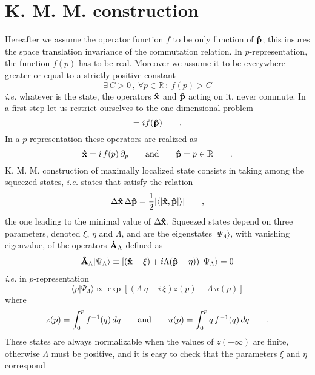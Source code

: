 \documentclass[a4paper,10pt]{article}
\newcommand{\x}{\mbox{\rm{\bf \^ x}}}
\newcommand{\p}{\mbox{\rm{\bf \^ p}}}
\newcommand{\A}{\mbox{\rm{\bf \^ A}}}
\newcommand{\f}{f({\p})}
\newcommand{\et}{\mbox{\rm{and}}}
\newcommand{\RR}{\mathbb R}
\newcommand{\KMM}{K. M. M. }
\begin{document}
\section{\KMM construction} Hereafter
we assume the operator function $f$ to be only function of $\p$;
this insures the space translation invariance of the commutation
relation. In $p$-representation, the function $f(p)$ has to be
real. Moreover we assume it to be everywhere greater or equal to a
strictly positive constant
\begin{equation}
\exists\, C>0\,,\ \forall p\in \RR\ :\ f(p)>C\label{C1}
\end{equation}
{\it i.e.} whatever is the state, the operators $\x$ and $\p$
acting on it, never commute. In a first step let us restrict
ourselves to the one dimensional problem
\begin{equation} [\x,\p]=i \f\qquad .
\end{equation} In a $p$-representation these operators are realized as
\begin{equation}
\x=i\,f(p)\,\partial_p\qquad \et \qquad \p=p \in \RR\qquad .
\end{equation} \KMM construction of maximally localized state
consists in taking among the squeezed states, {\it i.e.} states
that satisfy the relation
\begin{equation}\label{Hs}
\Delta \x\,\Delta\p = \frac12|\langle[\x,\p]\rangle|\qquad ,
\end{equation} the one leading to the minimal value of $\Delta \x$.
Squeezed states depend on three parameters, denoted $\xi$, $\eta$
and $\Lambda$, and are the eigenstates $|\Psi_\Lambda\rangle$,
with vanishing eigenvalue, of the operators $\A_\Lambda$ defined
as
\begin{eqnarray}
\A_\Lambda|\Psi_\Lambda\rangle\equiv\left[(\x-\xi)+i\Lambda(\p-\eta)
\right)|\Psi_\Lambda\rangle=0\label{CS}
\end{eqnarray}
{\it i.e.} in $p$-representation
\begin{equation}
\langle p|\Psi_\Lambda\rangle \propto
\exp[(\Lambda\,\eta-i\,\xi)z(p)-\Lambda\, u(p)]\label{sqstate}
\end{equation}
where
\begin{equation}
z(p)=\int_0^pf^{-1}(q)\,dq\qquad{\rm and}\qquad
u(p)=\int_0^pq\,f^{-1}(q)\,dq\qquad .\label{zu}
\end{equation}
These states are always normalizable when the values of $z(\pm
\infty)$ are finite, otherwise $\Lambda$ must be positive, and it
is easy to check that the parameters $\xi$ and $\eta$ correspond
\end{document}
